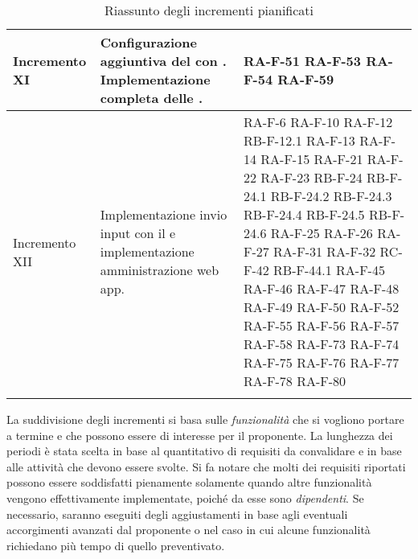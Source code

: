 \begin{center}
\begin{longtable}{|p{2.5cm}|p{6.5cm}|p{6cm}|}
	Incremento XI   & Configurazione aggiuntiva del \glock{gateway} con \glock{Kafka}. Implementazione completa delle \glock{API}. & RA-F-51 RA-F-53 RA-F-54 RA-F-59 \\ \hline
	Incremento XII	& Implementazione invio input con il \glock{bot Telegram} e implementazione amministrazione web app. & RA-F-6 RA-F-10 RA-F-12 RB-F-12.1 RA-F-13 RA-F-14 RA-F-15 RA-F-21 RA-F-22 RA-F-23 RB-F-24 RB-F-24.1 RB-F-24.2 RB-F-24.3 RB-F-24.4 RB-F-24.5 RB-F-24.6 RA-F-25 RA-F-26 RA-F-27 RA-F-31 RA-F-32 RC-F-42 RB-F-44.1 RA-F-45 RA-F-46 RA-F-47 RA-F-48 RA-F-49 RA-F-50 RA-F-52 RA-F-55 RA-F-56 RA-F-57 RA-F-58 RA-F-73 RA-F-74 RA-F-75 RA-F-76 RA-F-77 RA-F-78 RA-F-80 \\	\hline

	\caption{Riassunto degli incrementi pianificati}
	\end{longtable}
\end{center}
La suddivisione degli incrementi si basa sulle \textit{funzionalità} che si vogliono portare a termine e che possono essere di interesse per il proponente. La lunghezza dei periodi è stata scelta in base al quantitativo di requisiti da convalidare e in base alle attività che devono essere svolte. Si fa notare che molti dei requisiti riportati possono essere soddisfatti pienamente solamente quando altre funzionalità vengono effettivamente implementate, poiché da esse sono \textit{dipendenti}. 
\newline 
Se necessario, saranno eseguiti degli aggiustamenti in base agli eventuali accorgimenti avanzati dal proponente o nel caso in cui alcune funzionalità richiedano più tempo di quello preventivato.